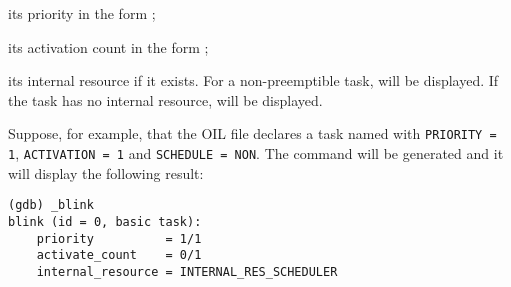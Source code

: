 \begin{pitemize}
\item its priority in the form ;
\item its activation count in the form ;
\item its internal resource if it exists. For a non-preemptible task,  will be displayed. If the task has no internal resource,  will be displayed.
\end{pitemize}

Suppose, for example, that the OIL file declares a task named  with \lstinline[language=OIL]{PRIORITY = 1}, \lstinline[language=OIL]{ACTIVATION = 1} and \lstinline[language=OIL]{SCHEDULE = NON}. The command  will be generated and it will display the following result:

\begin{lstlisting}
(gdb) _blink 
blink (id = 0, basic task):
	priority          = 1/1
	activate_count    = 0/1
	internal_resource = INTERNAL_RES_SCHEDULER
\end{lstlisting} 


